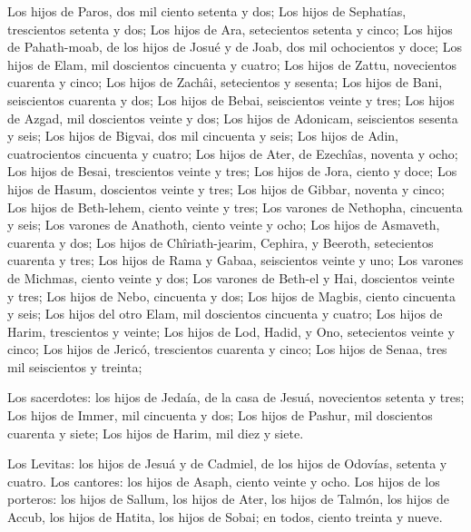  Los hijos de Paros, dos mil ciento setenta y dos;
 Los hijos de Sephatías, trescientos setenta y dos;
 Los hijos de Ara, setecientos setenta y cinco;
 Los hijos de Pahath-moab, de los hijos de Josué y de
Joab, dos mil ochocientos y doce;  Los hijos de Elam, mil
doscientos cincuenta y cuatro;  Los hijos de Zattu,
novecientos cuarenta y cinco;  Los hijos de Zachâi,
setecientos y sesenta;  Los hijos de Bani, seiscientos
cuarenta y dos;  Los hijos de Bebai, seiscientos veinte y
tres;  Los hijos de Azgad, mil doscientos veinte y dos;
 Los hijos de Adonicam, seiscientos sesenta y seis;
 Los hijos de Bigvai, dos mil cincuenta y seis;
 Los hijos de Adin, cuatrocientos cincuenta y cuatro;
 Los hijos de Ater, de Ezechîas, noventa y ocho;
 Los hijos de Besai, trescientos veinte y tres;
 Los hijos de Jora, ciento y doce;  Los
hijos de Hasum, doscientos veinte y tres;  Los hijos de
Gibbar, noventa y cinco;  Los hijos de Beth-lehem, ciento
veinte y tres;  Los varones de Nethopha, cincuenta y
seis;  Los varones de Anathoth, ciento veinte y ocho;
 Los hijos de Asmaveth, cuarenta y dos; 
Los hijos de Chîriath-jearim, Cephira, y Beeroth, setecientos cuarenta y
tres;  Los hijos de Rama y Gabaa, seiscientos veinte y
uno;  Los varones de Michmas, ciento veinte y dos;
 Los varones de Beth-el y Hai, doscientos veinte y tres;
 Los hijos de Nebo, cincuenta y dos;  Los
hijos de Magbis, ciento cincuenta y seis;  Los hijos del
otro Elam, mil doscientos cincuenta y cuatro;  Los hijos
de Harim, trescientos y veinte;  Los hijos de Lod, Hadid,
y Ono, setecientos veinte y cinco;  Los hijos de Jericó,
trescientos cuarenta y cinco;  Los hijos de Senaa, tres
mil seiscientos y treinta;

 Los sacerdotes: los hijos de Jedaía, de la casa de
Jesuá, novecientos setenta y tres;  Los hijos de Immer,
mil cincuenta y dos;  Los hijos de Pashur, mil doscientos
cuarenta y siete;  Los hijos de Harim, mil diez y siete.

 Los Levitas: los hijos de Jesuá y de Cadmiel, de los
hijos de Odovías, setenta y cuatro.  Los cantores: los
hijos de Asaph, ciento veinte y ocho.  Los hijos de los
porteros: los hijos de Sallum, los hijos de Ater, los hijos de Talmón,
los hijos de Accub, los hijos de Hatita, los hijos de Sobai; en todos,
ciento treinta y nueve.


